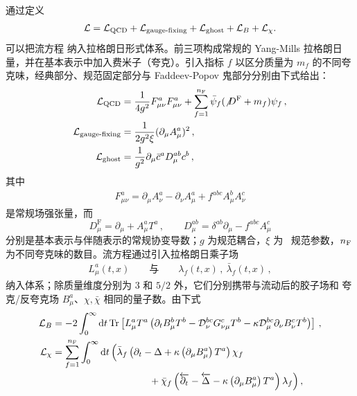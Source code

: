 通过定义
\begin{align}
  \mathcal{L} = \mathcal{L}_\mathrm{{\small QCD}} +
  \mathcal{L}_\textrm{gauge-fixing} + \mathcal{L}_\mathrm{ghost} +
  \mathcal{L}_{B} + \mathcal{L}_{\chi}.
  \label{eq:Lagrangian_complete}
\end{align}
可以把流方程  纳入拉格朗日形式体系。前三项构成常规的
Yang-Mills 拉格朗日量，并在基本表示中加入费米子（夸克）。引入指标 $f$
以区分质量为 $m_f$ 的不同夸克味，经典部分、规范固定部分与 Faddeev-Popov
鬼部分分别由下式给出：
\begin{equation}
  \begin{split}
  \mathcal{L}_\mathrm{{\small QCD}} &= \frac{1}{4g^2} F_{\mu \nu}^a F_{\mu
    \nu}^a + \sum_{f=1}^{n_\mathrm{F}}\bar{\psi}_f ( \not{D}^\mathrm{F}+m_f)
  \psi_f\,,\\ \mathcal{L}_\textrm{gauge-fixing}&= \frac{1}{2 g^2 \xi}
  (\partial_\mu A_\mu^a)^2\,,\\ \mathcal{L}_\mathrm{ghost} &=
  \frac{1}{g^2}\partial_\mu \bar{c}^a D_\mu^{ab} c^b\,,
  \label{eq:lags}
  \end{split}
\end{equation}
其中
\begin{equation}
  \begin{split}
    F_{\mu\nu}^a = \partial_\mu A^a_\nu - \partial_\nu A^a_\mu + f^{abc}A_\mu^bA_\nu^c
  \end{split}
\end{equation}
是常规场强张量，而
\begin{equation}
  D_\mu^\mathrm{F} = \partial_\mu + A_\mu^a T^a \,,\qquad D_\mu^{ab} = \delta^{ab} \partial_\mu - f^{abc} A_\mu^c
\end{equation}
分别是基本表示与伴随表示的常规协变导数；$g$ 为规范耦合，$\xi$ 为
\qcd\ 规范参数，$n_\mathrm{F}$ 为不同夸克味的数目。流方程通过引入拉格朗日乘子场
\begin{equation}
  \begin{split}
    L_\mu^a(t,x)\qquad\text{与}\qquad
    \lambda_f(t,x)\,,\ \bar\lambda_f(t,x)\,,
  \end{split}
\end{equation}
纳入体系；除质量维度分别为 $3$ 和 $5/2$ 外，它们分别携带与流动后的胶子场和
夸克/反夸克场 $B_\mu^a$、$\chi,\bar\chi$ 相同的量子数。由下式
\begin{equation}
  \begin{split}
  \mathcal{L}_{B} &= -2 \int_0^\infty \mathrm{d}t \, \textrm{Tr} \left[
    L_\mu^a T^a \left(\partial_t B_\mu^b T^b -\mathcal{D}_\nu^{bc}
    G_{\nu \mu}^c T^b - \kappa \mathcal{D}_\mu^{bc} \partial_\nu B_\nu^c
    T^b \right) \right]\,,\\ \mathcal{L}_{\chi} & =
  \sum_{f=1}^{\NF}\int_0^\infty \mathrm{d}t \, \Big( \bar{\lambda}_f
  \left(\partial_t - \Delta + \kappa \left(\partial_\mu B_\mu^a\right)
  T^a \right) \chi_f \\&\hspace*{10em}
  + \bar{\chi}_f \left(\overleftarrow{\partial_t} -
  \overleftarrow{\Delta} - \kappa \left(\partial_\mu B_\mu^a\right) T^a
  \right) \lambda_f \Big)\,,
  \label{eq:Lagrangian_flow}
  \end{split}
\end{equation}
